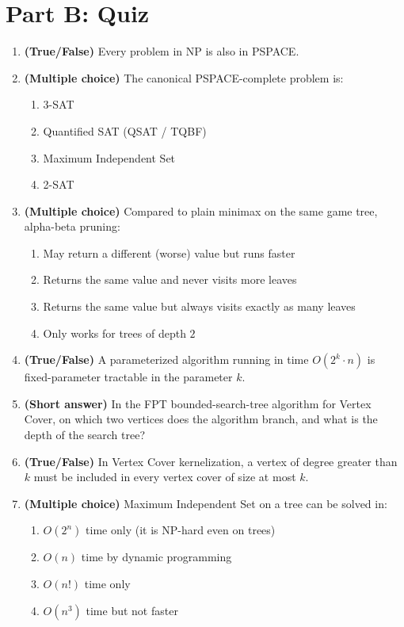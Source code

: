 \documentclass[11pt]{article}
\begin{document}
\newpage
\section*{Part B: Quiz}

\begin{enumerate}[label=\textbf{B\arabic*.}, leftmargin=2.2em]

\item \textbf{(True/False)} Every problem in NP is also in PSPACE.

\item \textbf{(Multiple choice)} The canonical PSPACE-complete problem is:
\begin{enumerate}[label=(\alph*)]
    \item 3-SAT
    \item Quantified SAT (QSAT / TQBF)
    \item Maximum Independent Set
    \item 2-SAT
\end{enumerate}

\item \textbf{(Multiple choice)} Compared to plain minimax on the same game
tree, alpha-beta pruning:
\begin{enumerate}[label=(\alph*)]
    \item May return a different (worse) value but runs faster
    \item Returns the same value and never visits more leaves
    \item Returns the same value but always visits exactly as many leaves
    \item Only works for trees of depth $2$
\end{enumerate}

\item \textbf{(True/False)} A parameterized algorithm running in time
$O(2^k \cdot n)$ is fixed-parameter tractable in the parameter $k$.

\item \textbf{(Short answer)} In the FPT bounded-search-tree algorithm for
Vertex Cover, on which two vertices does the algorithm branch, and what is the
depth of the search tree?

\item \textbf{(True/False)} In Vertex Cover kernelization, a vertex of degree
greater than $k$ must be included in every vertex cover of size at most $k$.

\item \textbf{(Multiple choice)} Maximum Independent Set on a tree can be solved
in:
\begin{enumerate}[label=(\alph*)]
    \item $O(2^n)$ time only (it is NP-hard even on trees)
    \item $O(n)$ time by dynamic programming
    \item $O(n!)$ time only
    \item $O(n^3)$ time but not faster
\end{enumerate}


\end{enumerate}
\end{document}
